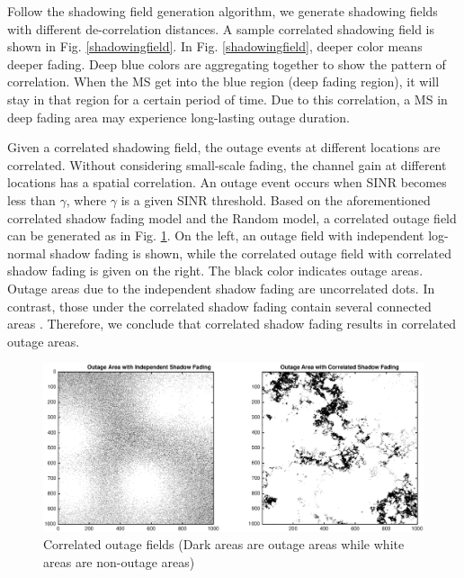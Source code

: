 \documentclass[journal,10pt]{IEEEtran}
\begin{document}
Follow the shadowing field generation algorithm, we generate shadowing fields with different  de-correlation distances. A sample correlated shadowing field is shown in Fig. \ref{shadowingfield}. In Fig. \ref{shadowingfield}, deeper color means deeper fading. Deep blue colors are aggregating together to show the pattern of correlation. When the MS get into the blue region (deep fading region), it will stay in that region for a certain period of time. Due to this correlation, a MS in deep fading area may experience long-lasting outage duration.
\par Given a correlated shadowing field, the outage events at different locations are correlated. Without considering small-scale fading, the channel gain at different locations has a spatial correlation. An outage event occurs when SINR becomes less than $\gamma$, where $\gamma$ is a given SINR threshold. Based on the aforementioned correlated shadow fading model and the Random model, a correlated outage field can be generated as in Fig. \ref{4:outagefie}. On the left, an outage field with independent log-normal shadow fading is shown, while the correlated outage field with correlated shadow fading is given on the right. The black color indicates outage areas. Outage areas due to the independent shadow fading are uncorrelated dots. In contrast, those under the correlated shadow fading contain several connected areas . Therefore, we conclude that correlated shadow fading results in correlated outage areas.

 \begin{figure}
 \centering
 \includegraphics[width=14cm]{outageArea.eps}
 \caption{Correlated outage fields (Dark areas are outage areas while white areas are non-outage areas)}
 \label{4:outagefie}
 \end{figure}
\end{document}
